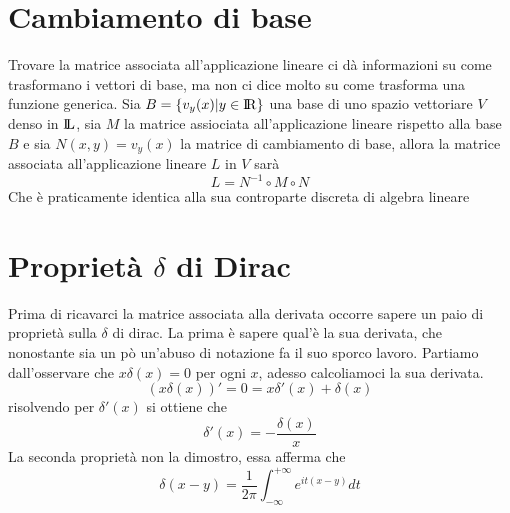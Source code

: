 \documentclass[11pt,a4paper]{report}
\theoremstyle{definition}
\theoremstyle{plain}
\theoremstyle{plain}
\begin{document}
		\section{Cambiamento di base}
			Trovare la matrice associata all'applicazione lineare ci dà informazioni su come trasformano i vettori di base, ma non ci dice molto su come trasforma una funzione generica.\newline
			Sia $B=\{v_{y}(x)|y\in \rm I\!R\}$ una base di uno spazio vettoriare $V$ denso in $\rm I\!L$, sia $M$ la matrice assiociata all'applicazione lineare rispetto alla base $B$ e sia $N(x,y)=v_{y}(x)$ la matrice di cambiamento di base, allora la matrice associata all'applicazione lineare $L$ in $V$ sarà
			\begin{equation}
				L=N^{-1}\circ M \circ N
			\end{equation}
			Che è praticamente identica alla sua controparte discreta di algebra lineare



		\section{Proprietà $\delta$ di Dirac}
			Prima di ricavarci la matrice associata alla derivata occorre sapere un paio di proprietà sulla $\delta$ di dirac.\newline
			La prima è sapere qual'è la sua derivata, che nonostante sia un pò un'abuso di notazione fa il suo sporco lavoro. Partiamo dall'osservare che $x\delta (x)=0$ per ogni $x$, adesso calcoliamoci la sua derivata.
			\[
				(x\delta (x))'=0= x\delta'(x) + \delta(x)
			\]
			risolvendo per $\delta'(x)$ si ottiene che 
			\begin{equation}
				\delta'(x)=-\frac{\delta(x)}{x}
			\end{equation}
			La seconda proprietà non la dimostro, essa afferma che
			\begin{equation}
				\delta(x-y)=\frac{1}{2\pi} \int_{-\infty}^{+\infty} e^{it(x-y)} dt
			\end{equation}
\end{document}
